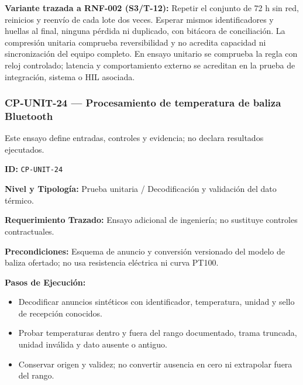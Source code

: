 \par\noindent\textbf{Variante trazada a RNF-002 (S3/T-12):} Repetir el conjunto de 72 h sin red, reinicios y reenvío de cada lote dos veces. Esperar mismos identificadores y huellas al final, ninguna pérdida ni duplicado, con bitácora de conciliación. La compresión unitaria comprueba reversibilidad y no acredita capacidad ni sincronización del equipo completo. En ensayo unitario se comprueba la regla con reloj controlado; latencia y comportamiento externo se acreditan en la prueba de integración, sistema o HIL asociada.\par
\subsubsection*{CP-UNIT-24 — Procesamiento de temperatura de baliza Bluetooth}\label{sec:9-cp-unit-24}

Este ensayo define entradas, controles y evidencia; no declara resultados ejecutados.

\par\noindent\textbf{ID:} \texttt{CP-\allowbreak{}UNIT-\allowbreak{}24}\par
\par\noindent\textbf{Nivel y Tipología:} Prueba unitaria / Decodificación y validación del dato térmico.\par
\par\noindent\textbf{Requerimiento Trazado:} Ensayo adicional de ingeniería; no sustituye controles contractuales.\par
\par\noindent\textbf{Precondiciones:} Esquema de anuncio y conversión versionado del modelo de baliza ofertado; no usa resistencia eléctrica ni curva PT100.\par
\par\noindent\textbf{Pasos de Ejecución:}\par
\begin{itemize}
\item Decodificar anuncios sintéticos con identificador, temperatura, unidad y sello de recepción conocidos.
\item Probar temperaturas dentro y fuera del rango documentado, trama truncada, unidad inválida y dato ausente o antiguo.
\item Conservar origen y validez; no convertir ausencia en cero ni extrapolar fuera del rango.
\end{itemize}

